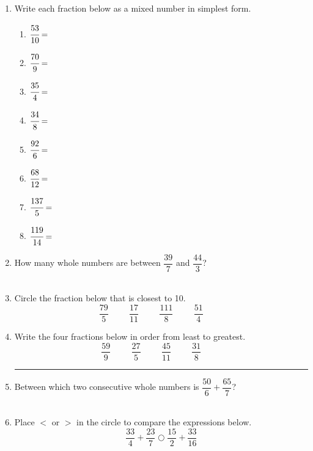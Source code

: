 \documentclass[12pt,letterpaper]{article}
\author{Shawn Ma}
\date{\today}
\begin{document}
\setlength{\parindent}{0pt}

\begin{large}
\begin{enumerate}
    \item Write each fraction below as a mixed number in simplest form.
    \begin{multicols}{2}
    \begin{enumerate}
        \item $\cfrac{53}{10}=$
        \item $\cfrac{70}{9}=$
        \item $\cfrac{35}{4}=$
        \item $\cfrac{34}{8}=$
        \item $\cfrac{92}{6}=$
        \item $\cfrac{68}{12}=$
        \item $\cfrac{137}{5}=$
        \item $\cfrac{119}{14}=$
    \end{enumerate}
    \end{multicols}

    \item How many whole numbers are between $\dfrac{39}{7}$ and $\dfrac{44}{3}$?\\\\
    \item Circle the fraction below that is closest to 10.
    \[
\dfrac{79}{5}\hspace{1cm}
\dfrac{17}{11}\hspace{1cm}
\dfrac{111}{8}\hspace{1cm}
\dfrac{51}{4}\hspace{1cm}
\]

    \item Write the four fractions below in order from least to greatest.
    \[
        \dfrac{59}{9}\hspace{1cm}
        \dfrac{27}{5}\hspace{1cm}
        \dfrac{45}{11}\hspace{1cm}
        \dfrac{31}{8}\hspace{1cm}
        \]
    \rule[-1cm]{\textwidth}{1pt}
      \item Between which two consecutive whole numbers
      is $\dfrac{50}{6}+\dfrac{65}{7}$?\\\\
     
     \item Place $<$ or $>$ in the circle to compare the expressions below.
\[
\dfrac{33}{4}+\dfrac{23}{7}\bigcirc\dfrac{15}{2}+\dfrac{33}{16}
\]


\end{enumerate}
\end{large}
\end{document}
